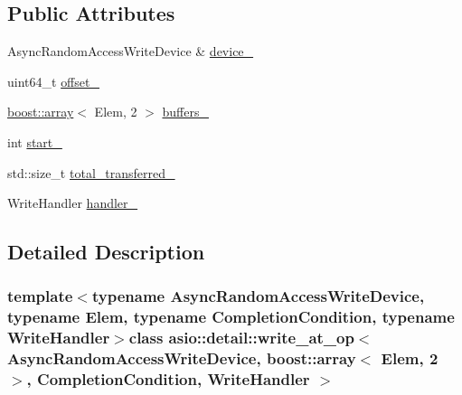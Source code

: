 \subsection*{Public Attributes}
\begin{DoxyCompactItemize}
\item 
Async\+Random\+Access\+Write\+Device \& \hyperlink{classasio_1_1detail_1_1write__at__op_3_01_async_random_access_write_device_00_01boost_1_1array_3e439bc739a816bec12c3cd7d54fe10a0_a9aa9bce544ac9239832813138f955995}{device\+\_\+}
\item 
uint64\+\_\+t \hyperlink{classasio_1_1detail_1_1write__at__op_3_01_async_random_access_write_device_00_01boost_1_1array_3e439bc739a816bec12c3cd7d54fe10a0_acd2bf2cb6828b74259a1bcef93e57001}{offset\+\_\+}
\item 
\hyperlink{classboost_1_1array}{boost\+::array}$<$ Elem, 2 $>$ \hyperlink{classasio_1_1detail_1_1write__at__op_3_01_async_random_access_write_device_00_01boost_1_1array_3e439bc739a816bec12c3cd7d54fe10a0_a28a1988ea0da8089ecb440d667a71c3b}{buffers\+\_\+}
\item 
int \hyperlink{classasio_1_1detail_1_1write__at__op_3_01_async_random_access_write_device_00_01boost_1_1array_3e439bc739a816bec12c3cd7d54fe10a0_a2b9bce629998958a019197c59245f0af}{start\+\_\+}
\item 
std\+::size\+\_\+t \hyperlink{classasio_1_1detail_1_1write__at__op_3_01_async_random_access_write_device_00_01boost_1_1array_3e439bc739a816bec12c3cd7d54fe10a0_a08cf6ce28355116cba46d99adc04e51f}{total\+\_\+transferred\+\_\+}
\item 
Write\+Handler \hyperlink{classasio_1_1detail_1_1write__at__op_3_01_async_random_access_write_device_00_01boost_1_1array_3e439bc739a816bec12c3cd7d54fe10a0_aeacdd65faab97db1ad970f9ddce7582b}{handler\+\_\+}
\end{DoxyCompactItemize}


\subsection{Detailed Description}
\subsubsection*{template$<$typename Async\+Random\+Access\+Write\+Device, typename Elem, typename Completion\+Condition, typename Write\+Handler$>$class asio\+::detail\+::write\+\_\+at\+\_\+op$<$ Async\+Random\+Access\+Write\+Device, boost\+::array$<$ Elem, 2 $>$,                           Completion\+Condition, Write\+Handler $>$}



